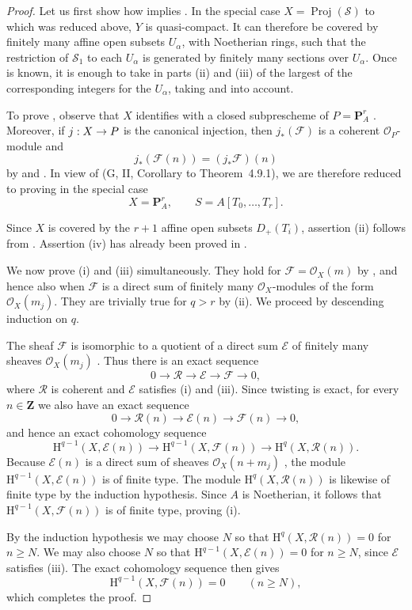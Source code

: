 \documentclass[oneside]{amsart}
\theoremstyle{ega-env-style}
\theoremstyle{ega-thm-env-style}
\theoremstyle{ega-defn-env-style}
\def\mathcal{\mathscr}
\def\sh{\mathcal}                   %
\def\bb{\mathbf}                    %
\def\geq{\geqslant}                 %
\def\HH{\mathrm{H}}                 %
\def\Proj{\operatorname{Proj}}
\renewcommand{\to}{\mathchoice{\longrightarrow}{\rightarrow}{\rightarrow}{\rightarrow}}
\newcommand{\oldpage}[2][]{{\marginnote{\normalfont{\textbf{#1}~|~#2}}}\ignorespaces}
\begin{document}
\begin{proof}
Let us first show how  implies .
In the special case $X=\Proj(\sh{S})$ to which  was reduced above, $Y$ is quasi-compact.
It can therefore be covered by finitely many affine open subsets $U_\alpha$, with Noetherian rings, such that the restriction of $\sh{S}_1$ to each $U_\alpha$ is generated by finitely many sections over $U_\alpha$.
Once  is known, it is enough to take in parts (ii) and (iii) of  the largest of the corresponding integers for the $U_\alpha$, taking  and  into account.

To prove , observe that $X$ identifies with a closed subprescheme of $P=\bb{P}_A^r$ .
Moreover, if $j:X\to P$ is the canonical injection, then $j_*(\sh{F})$ is a coherent $\sh{O}_P$-module and
\[
  j_*(\sh{F}(n))=(j_*\sh{F})(n)
\]
by  and .
In view of (G, II, Corollary to Theorem~4.9.1), we are therefore reduced to proving  in the special case
\[
  X=\bb{P}_A^r,
  \qquad S=A[T_0,\ldots,T_r].
\]

\oldpage[III]{101}

Since $X$ is covered by the $r+1$ affine open subsets $D_+(T_i)$, assertion (ii) follows from .
Assertion (iv) has already been proved in .

We now prove (i) and (iii) simultaneously.
They hold for $\sh{F}=\sh{O}_X(m)$ by , and hence also when $\sh{F}$ is a direct sum of finitely many $\sh{O}_X$-modules of the form $\sh{O}_X(m_j)$.
They are trivially true for $q>r$ by (ii).
We proceed by descending induction on $q$.

The sheaf $\sh{F}$ is isomorphic to a quotient of a direct sum $\sh{E}$ of finitely many sheaves $\sh{O}_X(m_j)$ .
Thus there is an exact sequence
\[
  0\longrightarrow\sh{R}\longrightarrow\sh{E}
   \longrightarrow\sh{F}\longrightarrow0,
\]
where $\sh{R}$ is coherent  and $\sh{E}$ satisfies (i) and (iii).
Since twisting is exact, for every $n\in\bb{Z}$ we also have an exact sequence
\[
  0\longrightarrow\sh{R}(n)\longrightarrow\sh{E}(n)
   \longrightarrow\sh{F}(n)\longrightarrow0,
\]
and hence an exact cohomology sequence
\[
  \HH^{q-1}(X,\sh{E}(n))
  \longrightarrow\HH^{q-1}(X,\sh{F}(n))
  \longrightarrow\HH^q(X,\sh{R}(n)).
\]
Because $\sh{E}(n)$ is a direct sum of sheaves $\sh{O}_X(n+m_j)$ , the module $\HH^{q-1}(X,\sh{E}(n))$ is of finite type.
The module $\HH^q(X,\sh{R}(n))$ is likewise of finite type by the induction hypothesis.
Since $A$ is Noetherian, it follows that $\HH^{q-1}(X,\sh{F}(n))$ is of finite type, proving (i).

By the induction hypothesis we may choose $N$ so that $\HH^q(X,\sh{R}(n))=0$ for $n\geq N$.
We may also choose $N$ so that $\HH^{q-1}(X,\sh{E}(n))=0$ for $n\geq N$, since $\sh{E}$ satisfies (iii).
The exact cohomology sequence then gives
\[
  \HH^{q-1}(X,\sh{F}(n))=0
  \qquad(n\geq N),
\]
which completes the proof.
\end{proof}
\end{document}

